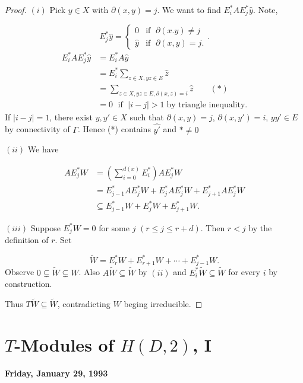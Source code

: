 \documentclass[
]{book}
\theoremstyle{definition}
\theoremstyle{definition}
\theoremstyle{definition}
\theoremstyle{definition}
\theoremstyle{remark}
\begin{document}
\begin{proof}
\leavevmode

\((i)\) Pick \(y\in X\) with \(\partial(x,y) = j\). We want to find \(E_i^*AE^*_j \hat{y}\). Note,

\[E_j^*\hat{y} = \begin{cases} 0 & \text{if }\; \partial(x.y)\neq j\\
\hat{y} & \text{if }\; \partial(x,y) = j.\end{cases}.\]
\begin{align}
E_i^*AE_j^*\hat{y} &= E_i^*A\hat{y} \\
& = E_i^*\sum_{z\in X, yz\in E}\hat{z}\\
& = \sum_{z\in X, yz\in E, \partial(x, z) = i}\hat{z} \qquad (*)\\
& = 0 \; \text{ if }\; |i-j|>1 \; \text{by triangle inequality.}
\end{align}
If \(|i-j| = 1\), there exist \(y, y'\in X\) such that \(\partial(x,y) = j\), \(\partial(x,y') = i\), \(yy'\in E\) by connectivity of \(\Gamma\). Hence
(*) contains \(\widehat{y'}\) and \(* \neq 0\)

\((ii)\) We have

\begin{align}
AE_j^*W & = \left(\sum_{i=0}^{d(x)}E_i^*\right)AE_j^*W\\
& = E_{j-1}^*AE^*_jW + E^*_jAE_j^*W + E^*_{j+1}AE_j^*W\\
& \subseteq E^*_{j-1}W + E^*_jW + E^*_{j+1}W.
\end{align}

\((iii)\) Suppose \(E_j^*W = 0\) for some \(j\) \((r\leq j \leq r+d)\). Then \(r < j\) by the definition of \(r\). Set

\[\tilde{W} = E^*_rW + E^*_{r+1}W + \cdots + E^*_{j-1}W.\]
Observe \(0\subsetneq \tilde{W} \subsetneq W\).
Also \(A\tilde{W} \subseteq \tilde{W}\) by \((ii)\) and \(E_i^*\tilde{W} \subseteq \tilde{W}\) for every \(i\) by construction.

Thus \(T\tilde{W} \subseteq \tilde{W}\), contradicting \(W\) beging irreducible.

\end{proof}

\hypertarget{lec5}{%
\chapter{\texorpdfstring{\(T\)-Modules of \(H(D,2)\), I}{T-Modules of H(D,2), I}}\label{lec5}}

\textbf{Friday, January 29, 1993}
\end{document}
